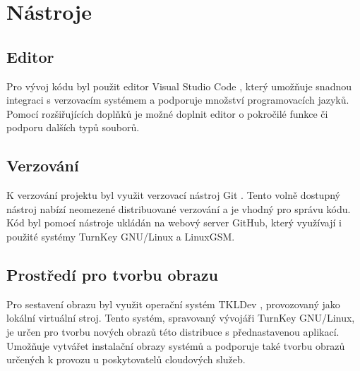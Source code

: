 \section{Nástroje}

\subsection{Editor}

Pro vývoj kódu byl použit editor Visual Studio Code \cite{vscode}, který umožňuje snadnou integraci s verzovacím systémem
a podporuje množství programovacích jazyků. Pomocí rozšiřujících doplňků je možné doplnit editor o pokročilé funkce či podporu
dalších typů souborů.

\subsection{Verzování}

K verzování projektu byl využit verzovací nástroj Git \cite{git}. Tento volně dostupný nástroj nabízí
neomezené distribuované verzování a je vhodný pro správu kódu.
Kód byl pomocí nástroje ukládán na webový server GitHub, který využívají i použité systémy TurnKey GNU/Linux
a LinuxGSM.

\subsection{Prostředí pro tvorbu obrazu}

Pro sestavení obrazu byl využit operační systém TKLDev \cite{tkldev}, provozovaný jako lokální virtuální stroj. Tento systém, spravovaný vývojáři TurnKey GNU/Linux,
je určen pro tvorbu nových obrazů této distribuce s přednastavenou aplikací. Umožňuje vytvářet instalační obrazy systémů a podporuje
také tvorbu obrazů určených k provozu u poskytovatelů cloudových služeb.